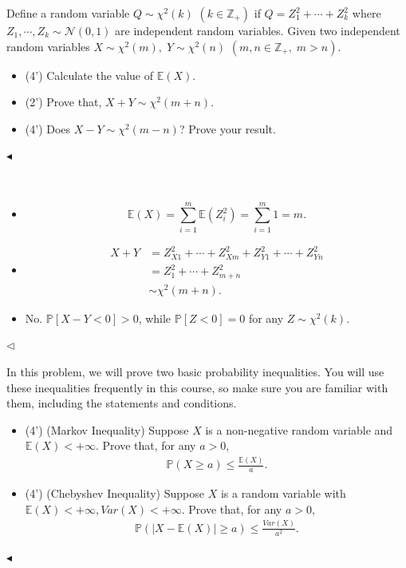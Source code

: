 ﻿\documentclass[11pt]{article}
\newenvironment{problem}[2][Problem]{\begin{trivlist}
\item[\hskip \labelsep {\bfseries #1}\hskip \labelsep {\bfseries #2.}]}{\hfill$\blacktriangleleft$\end{trivlist}}
\newenvironment{answer}[1][Answer]{\begin{trivlist}
\item[\hskip \labelsep {\bfseries #1.}\hskip \labelsep]}{\hfill$\lhd$\end{trivlist}}
\begin{document}
\begin{problem}{2 (10')}
Define a random variable $Q \sim \chi^2(k)$ $(k\in\mathbb{Z}_+)$ if $Q=Z_1^2+\cdots+Z_k^2$ where $Z_1,\cdots,Z_k \sim \mathcal{N}(0,1)$ are independent random variables. Given two independent random variables $X\sim\chi^2(m),\;Y\sim\chi^2(n)$ $(m,n\in\mathbb{Z}_+,\;m > n)$.
\begin{itemize}
    \item [(1)] (4') Calculate the value of $\mathbb{E}(X)$.
    \item [(2)] (2') Prove that, $X + Y \sim \chi^2(m + n)$.
    \item [(3)] (4') Does $X - Y \sim \chi^2(m - n)$? Prove your result.
\end{itemize}
\end{problem}

\begin{answer} ~
\begin{itemize}
    \item [(1)]
        $$
            \mathbb{E}(X) = \sum_{i=1}^{m} \mathbb{E}(Z_i^2) = \sum_{i=1}^{m} 1 = m.
        $$
    \item [(2)]
        $$
            \begin{aligned}
                X+Y &= Z_{X1}^2+\cdots+Z_{Xm}^2+Z_{Y1}^2+\cdots+Z_{Yn}^2\\
                &= Z_1^2+\cdots+Z_{m+n}^2\\
                &\sim \chi^2(m+n).
            \end{aligned}
        $$
    \item [(3)] No. $\mathbb P[X-Y<0]>0$, while $\mathbb P[Z<0]=0$ for any $Z\sim\chi^2(k)$.
\end{itemize}
\end{answer}



\begin{problem}{3 (8')} In this problem, we will prove two basic probability inequalities. You will use these inequalities frequently in this course, so make sure you are familiar with them, including the statements and conditions.
\begin{itemize}
    \item [(1)] (4') (Markov Inequality) Suppose $X$ is a non-negative random variable and $\mathbb{E}(X)<+\infty$. Prove that, for any $a>0$,
    \begin{align*}
        \mathbb{P}(X\geq a)\leq\frac{\mathbb{E}(X)}{a}.
    \end{align*}
    \item [(2)] (4') (Chebyshev Inequality) Suppose $X$ is a random variable with $\mathbb{E}(X)<+\infty, Var(X)<+\infty$. Prove that, for any $a>0$,
    \begin{align*}
        \mathbb{P}(|X-\mathbb{E}(X)|\geq a)\leq\frac{Var(X)}{a^2}.
    \end{align*}
\end{itemize}
\end{problem}
\end{document}
